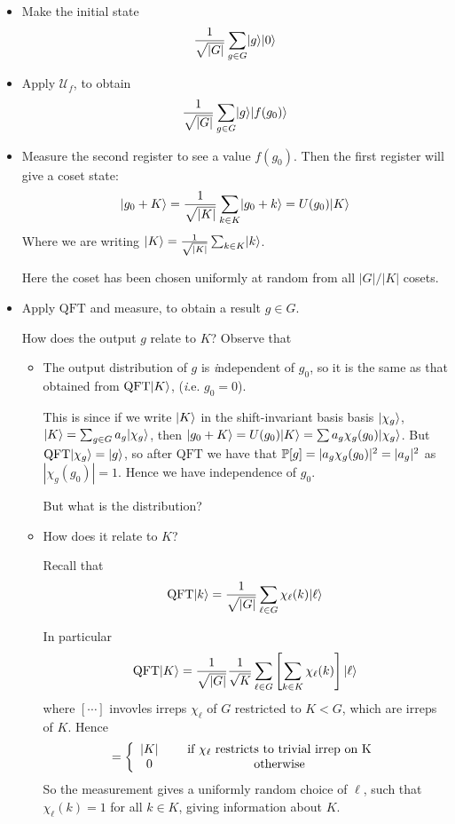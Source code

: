 \documentclass[]{article}
\renewcommand{\it}[1]{\textit{#1}}
\newcommand{\qft}{\textrm{QFT}}
\begin{document}
\begin{itemize}
	\item Make the initial state
	\begin{align*}
		\frac{1}{\sqrt{|G|}}\sum_{g\in G} \ket{g}\ket{0}
	\end{align*}
	\item Apply $\mathcal{U}_f$, to obtain
	\begin{align*}
		\frac{1}{\sqrt{|G|}}\sum_{g\in G}\ket{g}\ket{f(g_0)}
	\end{align*}
	\item Measure the second register to see a value $f(g_0)$. Then the first register will give a coset state:
	\begin{align*}
		\ket{g_0 + K} = \frac{1}{\sqrt{|K|}} \sum_{k\in K}\ket{g_0 + k} = U(g_0)\ket{K}
	\end{align*}
	Where we are writing $\ket{K} = \frac{1}{\sqrt{|K|}}\sum_{k\in K}\ket{k}$.
	
	Here the coset has been chosen uniformly at random from all $|G|/|K|$ cosets.
	
	\item Apply $\qft$ and measure, to obtain a result $g\in G$.
	
	How does the output $g$ relate to $K$? Observe that
	\begin{itemize}
		\item The output distribution of $g$ is {\it independent} of $g_0$, so it is the same as that obtained from $\qft\ket{K}$, ({\it i.e.} $g_0 = 0$).
		
		This is since if we write $\ket{K}$ in the shift-invariant basis basis $\ket{\chi_g}$, $\ket{K} = \sum_{g\in G}a_g \ket{\chi_g}$, then $\ket{g_0+K} = U(g_0)\ket{K} = \sum a_g\chi_g(g_0)\ket{\chi_g}$. But $\qft \ket{\chi_g} = \ket{g}$, so after $\qft$ we have that $\P[g] = |a_g\chi_g(g_0)|^2 = |a_g|^2$ as $|\chi_g(g_0)| = 1$. Hence we have independence of $g_0$.
		
		But what is the distribution?
		
		\item How does it relate to $K$?
		
		Recall that $$\qft\ket{k} = \frac{1}{\sqrt{|G|}} \sum_{\ell \in G} \chi_{\ell}(k)\ket{\ell}$$
		
		In particular
		\begin{align*}
			\qft\ket{K} = \frac{1}{\sqrt{|G|}} \frac{1}{\sqrt{K}} \sum_{\ell \in G} \left[\sum_{k\in K}\chi_{\ell}(k)\right] \ket{\ell}
		\end{align*}
	where $[\cdots]$ invovles irreps $\chi_\ell$ of $G$ restricted to $K < G$, which are irreps of $K$. Hence
	\begin{align*}
		[\cdots] = \left\lbrace \begin{array}{cc} |K|&\quad \textrm{ if }\chi_{\ell}\textrm{ restricts to trivial irrep on }$K$ \\ 0&\quad \textrm{ otherwise}\end{array}  \right.
	\end{align*}
So the measurement gives a uniformly random choice of $\ell$, such that $\chi_{\ell}(k) = 1$ for all $k \in K$, giving information about $K$.


\end{itemize}
\end{itemize}
\end{document}
